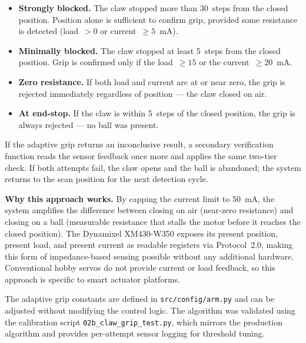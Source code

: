 \begin{itemize}
    \item \textbf{Strongly blocked.} The claw stopped more than
    30~steps from the closed position. Position alone is
    sufficient to confirm grip, provided some resistance is
    detected (load~$> 0$ or current~$\geq 5$~mA).

    \item \textbf{Minimally blocked.} The claw stopped at least
    5~steps from the closed position. Grip is confirmed only if
    the load~$\geq 15$ or the current~$\geq 20$~mA.

    \item \textbf{Zero resistance.} If both load and current are
    at or near zero, the grip is rejected immediately regardless
    of position --- the claw closed on air.

    \item \textbf{At end-stop.} If the claw is within 5~steps of
    the closed position, the grip is always rejected --- no ball
    was present.
\end{itemize}

If the adaptive grip returns an inconclusive result, a secondary
verification function reads the sensor feedback once more and
applies the same two-tier check. If both attempts fail, the claw
opens and the ball is abandoned; the system returns to the scan
position for the next detection cycle.

\textbf{Why this approach works.} By capping the current limit to
50~mA, the system amplifies the difference between closing on air
(near-zero resistance) and closing on a ball (measurable resistance
that stalls the motor before it reaches the closed position). The
Dynamixel XM430-W350 exposes its present position, present load,
and present current as readable registers via Protocol~2.0, making
this form of impedance-based sensing possible without any additional
hardware. Conventional hobby servos do not provide current or load
feedback, so this approach is specific to smart actuator platforms.

The adaptive grip constants are defined in
\texttt{src/config/arm.py} and can be adjusted without modifying
the control logic. The algorithm was validated using the
calibration script \texttt{02b\_claw\_grip\_test.py}, which mirrors
the production algorithm and provides per-attempt sensor logging
for threshold tuning.

